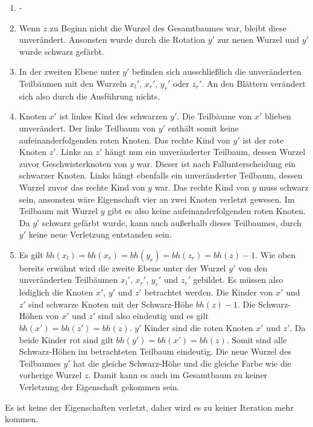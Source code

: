 \documentclass[a4paper,12pt]{article}
\begin{document}
\begin{enumerate}
	\item -
	\item Wenn $z$ zu Beginn nicht die Wurzel des Gesamtbaumes war, bleibt diese unverändert. Ansonsten wurde durch die Rotation $y'$ zur neuen Wurzel und $y'$ wurde schwarz gefärbt. 
	\item  In der zweiten Ebene unter $y'$ befinden sich ausschließlich die unveränderten Teilbäumen mit den Wurzeln ${x_l}'$, ${x_r}'$, ${y_r}'$ oder ${z_r}'$. An den Blättern verändert sich also durch die Ausführung nichts.
	\item  Knoten $x'$ ist linkes Kind des schwarzen $y'$. Die Teilbäume von $x'$ blieben unverändert. Der linke Teilbaum von $y'$ enthält somit keine aufeinanderfolgenden roten Knoten. Das rechte Kind von $y'$ ist der rote Knoten $z'$. Links an $z'$ hängt nun ein unveränderter Teilbaum, dessen Wurzel zuvor Geschwisterknoten von $y$ war. Dieser ist nach Fallunterscheidung ein schwarzer Knoten. Links hängt ebenfalls ein unveränderter Teilbaum, dessen Wurzel zuvor das rechte Kind von $y$ war. Das rechte Kind von $y$ muss schwarz sein, ansonsten wäre Eigenschaft vier an zwei Knoten verletzt gewesen. Im Teilbaum mit Wurzel $y$ gibt es also keine aufeinanderfolgenden roten Knoten. Da $y'$ schwarz gefärbt wurde, kann auch außerhalb dieses Teilbaumes, durch $y'$ keine neue Verletzung entstanden sein.
	\item  Es gilt  $\mathit{bh(x_l)} = \mathit{bh(x_r)} = \mathit{bh(y_r)} =  \mathit{bh(z_r)} = \mathit{bh(z)} - 1$. Wie oben bereits erwähnt wird die zweite Ebene unter der Wurzel $y'$ von den unveränderten Teilbäumen ${x_l}'$, ${x_r}'$, ${y_r}'$ und ${z_r}'$ gebildet. Es müssen also lediglich die Knoten $x'$, $y'$ und $z'$ betrachtet werden. Die Kinder von $x'$ und $z'$ sind schwarze Knoten mit der Schwarz-Höhe $\mathit{bh(z)} - 1$. Die Schwarz-Höhen von $x'$ und $z'$ sind also eindeutig und es gilt $\mathit{bh(x')} = \mathit{bh(z')} = \mathit{bh(z)}$. $y'$ Kinder sind die roten Knoten $x'$ und $z'$. Da beide Kinder rot sind gilt $\mathit{bh(y')} = \mathit{bh(x')} = \mathit{bh(z)}$. Somit sind alle Schwarz-Höhen im betrachteten Teilbaum eindeutig. Die neue Wurzel des Teilbaumes $y'$ hat die gleiche Schwarz-Höhe und die gleiche Farbe wie die vorherige Wurzel $z$. Damit kann es auch im Gesamtbaum zu keiner Verletzung der Eigenschaft gekommen sein.
\end{enumerate} 

\noindent Es ist keine der Eigenschaften verletzt, daher wird es zu keiner Iteration mehr kommen.
\end{document}
